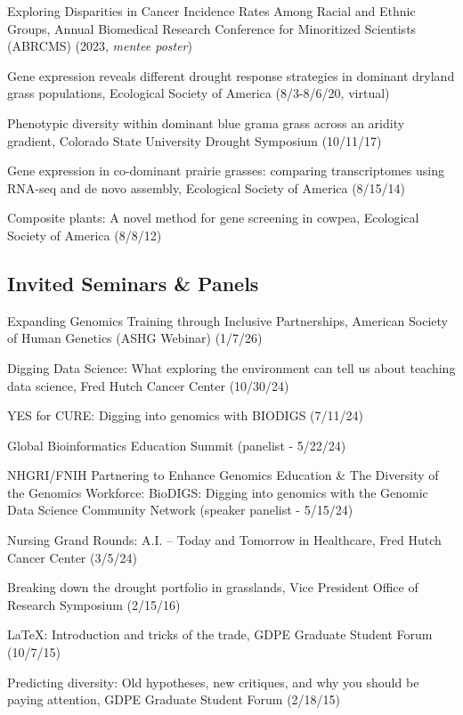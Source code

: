 \documentclass{cv}
\begin{document}
Exploring Disparities in Cancer Incidence Rates Among Racial and Ethnic Groups, Annual Biomedical Research Conference for Minoritized Scientists (ABRCMS) (2023, \textit{mentee poster})

Gene expression reveals different drought response strategies in dominant dryland grass populations, Ecological Society of America (8/3-8/6/20, virtual)

Phenotypic diversity within dominant blue grama grass across an aridity gradient, Colorado State University Drought Symposium (10/11/17)

Gene expression in co-dominant prairie grasses: comparing transcriptomes using RNA-seq and de novo assembly, Ecological Society of America (8/15/14)

Composite plants: A novel method for gene screening in cowpea, Ecological Society of America (8/8/12)

\subsection*{Invited Seminars \& Panels}

Expanding Genomics Training through Inclusive Partnerships, American Society of Human Genetics (ASHG Webinar) (1/7/26) %

Digging Data Science: What exploring the environment can tell us about teaching data science, Fred Hutch Cancer Center (10/30/24)

YES for CURE: Digging into genomics with BIODIGS (7/11/24)

Global Bioinformatics Education Summit (panelist - 5/22/24) %

NHGRI/FNIH Partnering to Enhance Genomics Education \& The Diversity of the Genomics Workforce: BioDIGS: Digging into genomics with the Genomic Data Science Community Network (speaker panelist - 5/15/24)

Nursing Grand Rounds: A.I. – Today and Tomorrow in Healthcare, Fred Hutch Cancer Center (3/5/24)

Breaking down the drought portfolio in grasslands, Vice President Office of Research Symposium (2/15/16)

\LaTeX: Introduction and tricks of the trade, GDPE Graduate Student Forum (10/7/15)

Predicting diversity: Old hypotheses, new critiques, and why you should be paying attention, GDPE Graduate Student Forum (2/18/15)
\end{document}

